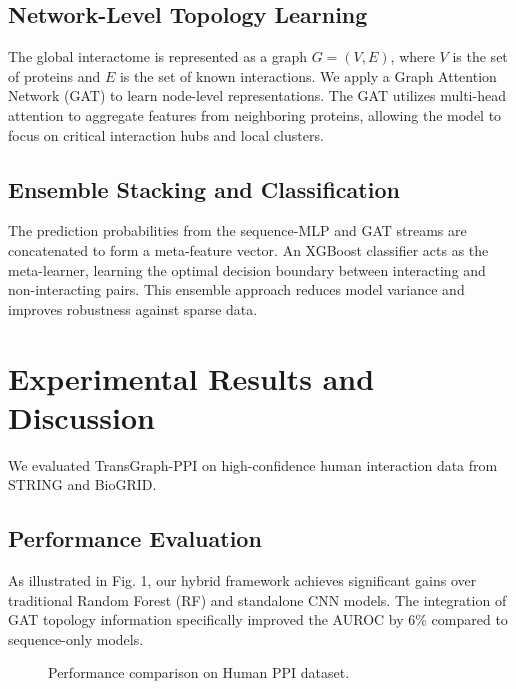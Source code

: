 \documentclass[conference]{IEEEtran}
\begin{document}
\subsection{Network-Level Topology Learning}
The global interactome is represented as a graph $G = (V, E)$, where $V$ is the set of proteins and $E$ is the set of known interactions. We apply a Graph Attention Network (GAT) to learn node-level representations. The GAT utilizes multi-head attention to aggregate features from neighboring proteins, allowing the model to focus on critical interaction hubs and local clusters.

\subsection{Ensemble Stacking and Classification}
The prediction probabilities from the sequence-MLP and GAT streams are concatenated to form a meta-feature vector. An XGBoost classifier acts as the meta-learner, learning the optimal decision boundary between interacting and non-interacting pairs. This ensemble approach reduces model variance and improves robustness against sparse data.

\section{Experimental Results and Discussion}
We evaluated TransGraph-PPI on high-confidence human interaction data from STRING and BioGRID.

\subsection{Performance Evaluation}
As illustrated in Fig. 1, our hybrid framework achieves significant gains over traditional Random Forest (RF) and standalone CNN models. The integration of GAT topology information specifically improved the AUROC by 6\% compared to sequence-only models.

\begin{figure}[htbp]
\centering
{}
\caption{Performance comparison on Human PPI dataset.}
\label{fig:performance}
\end{figure}
\end{document}
